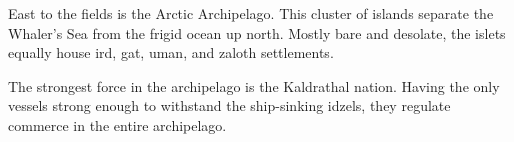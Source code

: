 East to the fields is the Arctic Archipelago.
This cluster of islands separate the Whaler's Sea from the frigid ocean up north.
Mostly bare and desolate, the islets equally house ird, gat, uman, and zaloth settlements.

The strongest force in the archipelago is the Kaldrathal nation.
Having the only vessels strong enough to withstand the ship-sinking idzels, they regulate commerce in the entire archipelago.
